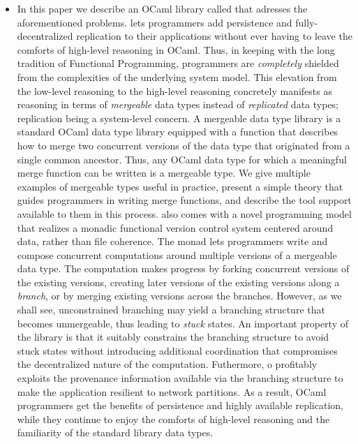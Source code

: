 \begin{itemize}
  \item In this paper we describe an OCaml library called \name that
  adresses the aforementioned problems. \name lets programmers add
  persistence and fully-decentralized replication to their
  applications without ever having to leave the comforts of high-level
  reasoning in OCaml. Thus, in keeping with the long tradition of
  Functional Programming, programmers are \emph{completely} shielded
  from the complexities of the underlying system model. This elevation
  from the low-level reasoning to the high-level reasoning concretely
  manifests as reasoning in terms of \emph{mergeable} data types
  instead of \emph{replicated} data types; replication being a
  system-level concern. A mergeable data type library is a standard
  OCaml data type library equipped with a  function that
  describes how to merge two concurrent versions of the data type that
  originated from a single common ancestor. Thus, any OCaml data type
  for which a meaningful merge function can be written is a mergeable
  type. We give multiple examples of mergeable types useful in
  practice, present a simple theory that guides programmers in writing
  merge functions, and describe the tool support available to them in
  this process. \name also comes with a novel programming model that
  realizes a monadic functional version control system centered around
  data, rather than file coherence. The \name monad lets programmers
  write and compose concurrent computations around multiple versions
  of a mergeable data type. The computation makes progress by forking
  concurrent versions of the existing versions, creating later
  versions of the existing versions along a \emph{branch}, or by
  merging existing versions across the branches. However, as we shall
  see, unconstrained branching may yield a branching structure that
  becomes unmergeable, thus leading to \emph{stuck} states. An
  important property of the \name library is that it suitably
  constrains the branching structure to avoid stuck states without
  introducing additional coordination that compromises the
  decentralized nature of the computation. Futhermore, \name
o  profitably exploits the provenance information available via the
  branching structure to make the application resilient to network
  partitions. As a result, OCaml programmers get the benefits of
  persistence and highly available replication, while they continue to
  enjoy the comforts of high-level reasoning and the familiarity of
  the standard library data types.


\end{itemize}

